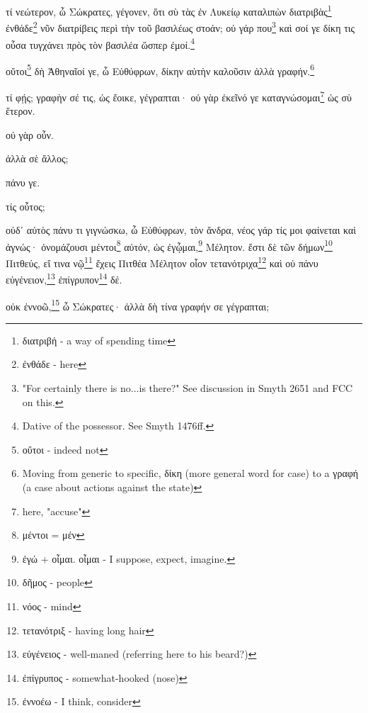 \pagebreak


\versification{[2a]}
τί
νεώτερον,
ὦ
Σώκρατες,
γέγονεν,
ὅτι
σὺ
τὰς
ἐν
Λυκείῳ
καταλιπὼν
διατριβὰς\footnote{διατριβή - a way of spending time}
ἐνθάδε\footnote{ἐνθάδε - here}
νῦν
διατρίβεις
περὶ
τὴν
τοῦ
βασιλέως
στοάν;
οὐ
γάρ
που\footnote{"For certainly there is no...is there?" See discussion in Smyth 2651 and FCC on this.}
καὶ
σοί
γε
δίκη
τις
οὖσα
τυγχάνει
πρὸς
τὸν
βασιλέα
ὥσπερ
ἐμοί.\footnote{Dative of the possessor. See Smyth 1476ff.}

οὔτοι\footnote{οὔτοι - indeed not}
δὴ
Ἀθηναῖοί
γε,
ὦ
Εὐθύφρων,
δίκην
αὐτὴν
καλοῦσιν
ἀλλὰ
γραφήν.\footnote{Moving from generic to specific, δίκη (more general word for case) to a γραφή (a case about actions against the state)}

\versification{[2b]}
τί
φῄς;
γραφὴν
σέ
τις,
ὡς
ἔοικε,
γέγραπται·
οὐ
γὰρ
ἐκεῖνό
γε
καταγνώσομαι\footnote{here, "accuse"}
ὡς
σὺ
ἕτερον.

οὐ
γὰρ
οὖν.

ἀλλὰ
σὲ
ἄλλος;

πάνυ
γε.

τίς
οὗτος;

οὐδ᾽
αὐτὸς
πάνυ
τι
γιγνώσκω,
ὦ
Εὐθύφρων,
τὸν
ἄνδρα,
νέος
γάρ
τίς
μοι
φαίνεται
καὶ
ἀγνώς·
ὀνομάζουσι
μέντοι\footnote{μέντοι = μέν}
αὐτόν,
ὡς
ἐγᾦμαι,\footnote{ἐγώ + οἶμαι. οἶμαι - I suppose, expect, imagine.}
Μέλητον.
ἔστι
δὲ
τῶν
δήμων\footnote{δῆμος - people}
Πιτθεύς,
εἴ
τινα
νῷ\footnote{νόος - mind}
ἔχεις
Πιτθέα
Μέλητον
οἷον
τετανότριχα\footnote{τετανότριξ - having long hair}
καὶ
οὐ
πάνυ
εὐγένειον,\footnote{εὐγένειος - well-maned (referring here to his beard?)}
ἐπίγρυπον\footnote{ἐπίγρυπος - somewhat-hooked (nose)}
δέ.

οὐκ
ἐννοῶ,\footnote{ἐννοέω - I think, consider}
ὦ
Σώκρατες·
ἀλλὰ
δὴ
τίνα
γραφήν
\versification{[2c]}
σε
γέγραπται;

